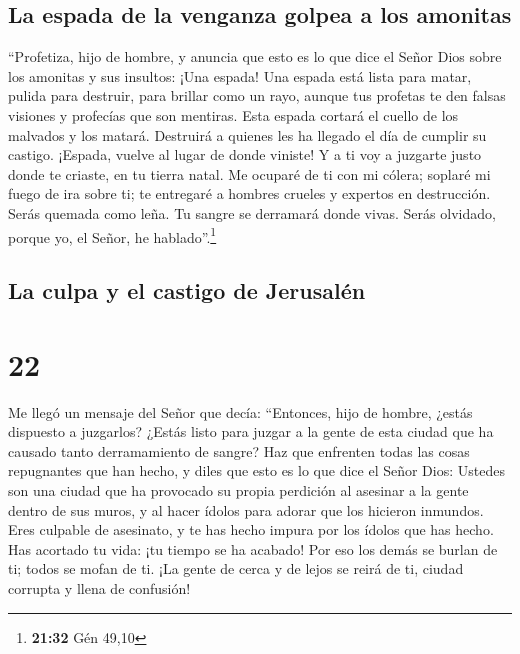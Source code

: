 \hypertarget{la-espada-de-la-venganza-golpea-a-los-amonitas}{%
\subsection{La espada de la venganza golpea a los
amonitas}\label{la-espada-de-la-venganza-golpea-a-los-amonitas}}

 ``Profetiza, hijo de hombre, y anuncia que esto es lo
que dice el Señor Dios sobre los amonitas y sus insultos: ¡Una espada!
Una espada está lista para matar, pulida para destruir, para brillar
como un rayo,  aunque tus profetas te den falsas visiones
y profecías que son mentiras. Esta espada cortará el cuello de los
malvados y los matará. Destruirá a quienes les ha llegado el día de
cumplir su castigo.  ¡Espada, vuelve al lugar de donde
viniste! Y a ti voy a juzgarte justo donde te criaste, en tu tierra
natal.  Me ocuparé de ti con mi cólera; soplaré mi fuego
de ira sobre ti; te entregaré a hombres crueles y expertos en
destrucción.  Serás quemada como leña. Tu sangre se
derramará donde vivas. Serás olvidado, porque yo, el Señor, he
hablado''.\footnote{\textbf{21:32} Gén 49,10}

\hypertarget{la-culpa-y-el-castigo-de-jerusaluxe9n}{%
\subsection{La culpa y el castigo de
Jerusalén}\label{la-culpa-y-el-castigo-de-jerusaluxe9n}}

\hypertarget{section-21}{%
\section{22}\label{section-21}}

 Me llegó un mensaje del Señor que decía: 
``Entonces, hijo de hombre, ¿estás dispuesto a juzgarlos? ¿Estás listo
para juzgar a la gente de esta ciudad que ha causado tanto derramamiento
de sangre? Haz que enfrenten todas las cosas repugnantes que han hecho,
 y diles que esto es lo que dice el Señor Dios: Ustedes
son una ciudad que ha provocado su propia perdición al asesinar a la
gente dentro de sus muros, y al hacer ídolos para adorar que los
hicieron inmundos.  Eres culpable de asesinato, y te has
hecho impura por los ídolos que has hecho. Has acortado tu vida: ¡tu
tiempo se ha acabado! Por eso los demás se burlan de ti; todos se mofan
de ti.  ¡La gente de cerca y de lejos se reirá de ti,
ciudad corrupta y llena de confusión!

